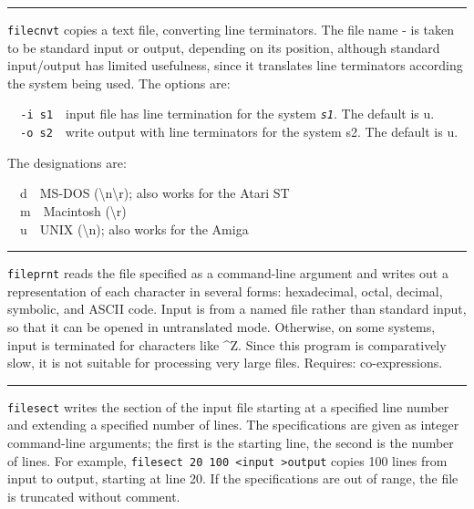 {{{{{\vspace{0.25cm}\hrule{}

\texttt{filecnvt} copies a text file, converting line terminators. The
file name {\textquotedbl}-{\textquotedbl} is taken to be standard input
or output, depending on its position, although standard input/output
has limited usefulness, since it translates line terminators according
the system being used. The options are:


\texttt{\ \ {}-i s1}\ \ input file has line termination for the system
\texttt{\textit{s1}}. The default is
{\textquotedbl}u{\textquotedbl}.\\
\ \ \texttt{{}-o s2}\ \ write output with line terminators for the
system s2. The default is {\textquotedbl}u{\textquotedbl}.

The designations are:

\ \ d\ \ MS-DOS
({\textquotedbl}{\textbackslash}n{\textbackslash}r{\textquotedbl});
also works for the Atari ST\\
\ \ m\ \ Macintosh
({\textquotedbl}{\textbackslash}r{\textquotedbl})\\
\ \ u\ \ UNIX ({\textquotedbl}{\textbackslash}n{\textquotedbl}); also
works for the Amiga

\vspace{0.25cm}\hrule{}

\texttt{fileprnt} reads the file specified as a command-line argument
and writes out a representation of each character in several forms:
hexadecimal, octal, decimal, symbolic, and ASCII code.
Input is from a named file rather than standard input, so that it can
be opened in untranslated mode. Otherwise, on some systems, input is
terminated for characters like \^{}Z. Since this program is
comparatively slow, it is not suitable for processing very large files.
Requires: co-expressions.

\vspace{0.25cm}\hrule{}

\texttt{filesect} writes the section of the input file starting at a
specified line number and extending a specified number of lines. The
specifications are given as integer command-line arguments; the first
is the starting line, the second is the number of lines. For example,
\texttt{filesect 20 100 {\textless}input {\textgreater}output} copies
100 lines from input to output, starting at line 20. If the
specifications are out of range, the file is truncated without comment.

}}}}}
